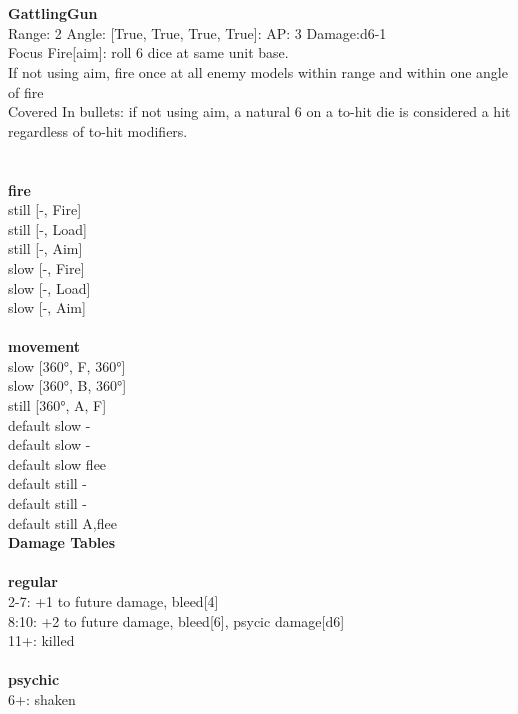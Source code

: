 \ \\

\ \\
{\bf GattlingGun } \\



Range: 2  Angle: [True, True, True, True]: AP: 3 Damage:d6-1 \\
Focus Fire[aim]: roll 6 dice at same unit base.\\ 
If not using aim, fire once at all enemy models within range and within one angle of fire\\ 
Covered In bullets: if not using aim, a natural 6 on a to-hit die is considered a hit regardless of to-hit modifiers.\\ 




 
\ \\



\ \\ {\bf fire } \\
still [-, Fire] \\
still [-, Load] \\
still [-, Aim] \\
slow [-, Fire] \\
slow [-, Load] \\
slow [-, Aim] \\
\ \\ {\bf movement } \\
slow [360°, F, 360°] \\
slow [360°, B, 360°] \\
still [360°, A, F] \\
default slow - \\
default slow - \\
default slow flee \\
default still - \\
default still - \\
default still A,flee \\


{\bf Damage Tables} \\
\ \\ {\bf regular } \\
2-7: +1 to future damage, bleed[4] \\
8:10: +2 to future damage, bleed[6], psycic damage[d6] \\
11+: killed \\
\ \\ {\bf psychic } \\
6+: shaken \\










